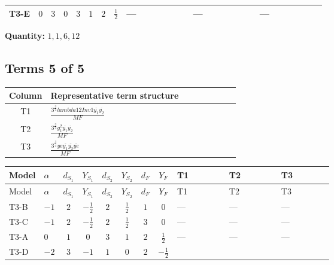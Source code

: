\documentclass[8pt]{article}
\begin{document}
\begin{landscape}
\begin{longtable}{@{}llcccccc >{\raggedright\arraybackslash}p{0.21\linewidth} >{\raggedright\arraybackslash}p{0.21\linewidth} >{\raggedright\arraybackslash}p{0.21\linewidth}@{}}
\midrule
T3-E & $0$ & $3$ & $0$ & $3$ & $1$ & $2$ & $\frac{1}{2}$ & --- & --- & --- \\
\midrule
\bottomrule
\end{longtable}
\clearpage
\noindent\textbf{Quantity: }$\mathrm{1,1,6,12}$\par\smallskip
\subsection*{Terms 5 of 5}
\begin{center}
\begin{tabular}{@{}c >{\raggedright\arraybackslash}p{0.82\linewidth}@{}}
\toprule
Column & Representative term structure \\
\midrule
T1 & \(\displaystyle \frac{3^{\frac{3}{4}} lambda12Inv1 \overline{y_{1}} \overline{y_{2}}}{MF}\) \\
\midrule
T2 & \(\displaystyle \frac{3^{\frac{3}{4}} g_{1}^{2} \overline{y_{1}} \overline{y_{2}}}{MF}\) \\
\midrule
T3 & \(\displaystyle \frac{3^{\frac{3}{4}} ye \overline{y_{1}} \overline{y_{2}} \overline{ye}}{MF}\) \\
\midrule
\bottomrule
\end{tabular}
\end{center}
\smallskip
\tiny
\begin{longtable}{@{}llcccccc >{\raggedright\arraybackslash}p{0.21\linewidth} >{\raggedright\arraybackslash}p{0.21\linewidth} >{\raggedright\arraybackslash}p{0.21\linewidth}@{}}
\toprule
Model & $\alpha$ & $d_{S_1}$ & $Y_{S_1}$ & $d_{S_2}$ & $Y_{S_2}$ & $d_F$ & $Y_F$ & T1 & T2 & T3 \\
\midrule
\endfirsthead
\toprule
Model & $\alpha$ & $d_{S_1}$ & $Y_{S_1}$ & $d_{S_2}$ & $Y_{S_2}$ & $d_F$ & $Y_F$ & T1 & T2 & T3 \\
\midrule
\endhead
T3-B & $-1$ & $2$ & $-\frac{1}{2}$ & $2$ & $\frac{1}{2}$ & $1$ & $0$ & --- & --- & --- \\
\midrule
T3-C & $-1$ & $2$ & $-\frac{1}{2}$ & $2$ & $\frac{1}{2}$ & $3$ & $0$ & --- & --- & --- \\
\midrule
T3-A & $0$ & $1$ & $0$ & $3$ & $1$ & $2$ & $\frac{1}{2}$ & --- & --- & --- \\
\midrule
T3-D & $-2$ & $3$ & $-1$ & $1$ & $0$ & $2$ & $-\frac{1}{2}$ & \scriptsize\adjustbox{max width=\linewidth}{$\begin{gathered} - \frac{3^{\frac{3}{4}} lambda12Inv1 \overline{y_{1}} \overline{y_{2}}}{6 MF}\end{gathered}$} & \scriptsize\adjustbox{max width=\linewidth}{$\begin{gathered} - \frac{3^{\frac{3}{4}} g_{1}^{2} \overline{y_{1}} \overline{y_{2}}}{8 MF}\end{gathered}$} & \scriptsize\adjustbox{max width=\linewidth}{$\begin{gathered} \frac{3^{\frac{3}{4}} ye \overline{y_{1}} \overline{y_{2}} \overline{ye}}{12 MF}\end{gathered}$} \\

\end{longtable}
\end{landscape}
\end{document}
